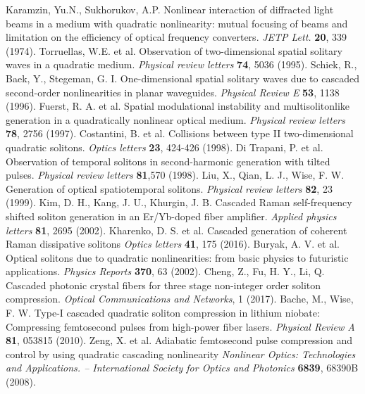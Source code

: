 \documentclass[a4paper, 12pt, onecolumn]{extarticle}
\begin{document}
\begin{thebibliography}{0}
 Karamzin, Yu.N., Sukhorukov, A.P. Nonlinear interaction of diffracted light beams in a medium with quadratic nonlinearity: mutual focusing of beams and limitation on the efficiency of optical frequency converters. \textit{JETP Lett.} \textbf{20}, 339 (1974).
 Torruellas, W.E. et al. Observation of two-dimensional spatial solitary waves in a quadratic medium. \textit{Physical review letters} \textbf{74}, 5036 (1995).
 Schiek, R., Baek, Y., Stegeman, G. I. One-dimensional spatial solitary waves due to cascaded second-order nonlinearities in planar waveguides. \textit{Physical Review E} \textbf{53}, 1138 (1996).
 Fuerst, R. A. et al. Spatial modulational instability and multisolitonlike generation in a quadratically nonlinear optical medium. \textit{Physical review letters} \textbf{78}, 2756 (1997).
 Costantini, B. et al. Collisions between type II two-dimensional quadratic solitons. \textit{Optics letters} \textbf{23}, 424-426 (1998).
 Di Trapani, P. et al. Observation of temporal solitons in second-harmonic generation with tilted pulses. \textit{Physical review letters} \textbf{81},570 (1998).
 Liu, X., Qian, L. J., Wise, F. W. Generation of optical spatiotemporal solitons. \textit{Physical review letters} \textbf{82}, 23 (1999).
 Kim, D. H., Kang, J. U., Khurgin, J. B. Cascaded Raman self-frequency shifted soliton generation in an Er/Yb-doped fiber amplifier. \textit{Applied physics letters} \textbf{81}, 2695 (2002).
 Kharenko, D. S. et al. Cascaded generation of coherent Raman dissipative solitons \textit{Optics letters} \textbf{41}, 175 (2016).
 Buryak, A. V. et al. Optical solitons due to quadratic nonlinearities: from basic physics to futuristic applications. \textit{Physics Reports} \textbf{370}, 63 (2002).
 Cheng, Z., Fu, H. Y., Li, Q. Cascaded photonic crystal fibers for three stage non-integer order soliton compression. \textit{Optical Communications and Networks}, 1 (2017).
 Bache, M., Wise, F. W. Type-I cascaded quadratic soliton compression in lithium niobate: Compressing femtosecond pulses from high-power fiber lasers. \textit{Physical Review A} \textbf{81}, 053815 (2010).
 Zeng, X. et al. Adiabatic femtosecond pulse compression and control by using quadratic cascading nonlinearity \textit{Nonlinear Optics: Technologies and Applications. -- International Society for Optics and Photonics} \textbf{6839}, 68390B (2008).

\end{thebibliography}
\end{document}
